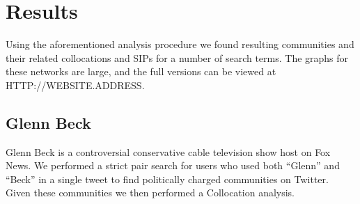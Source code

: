 \section{Results}
Using the aforementioned analysis procedure we found resulting communities and their related collocations and SIPs for a number of search terms.  The graphs for these networks are large, and the full versions can be viewed at HTTP://WEBSITE.ADDRESS.

\subsection{Glenn Beck}
Glenn Beck is a controversial conservative cable television show host on Fox News.  We performed a strict pair search for users who used both ``Glenn'' and ``Beck'' in a single tweet to find politically charged communities on Twitter.  Given these communities we then performed a Collocation analysis.

